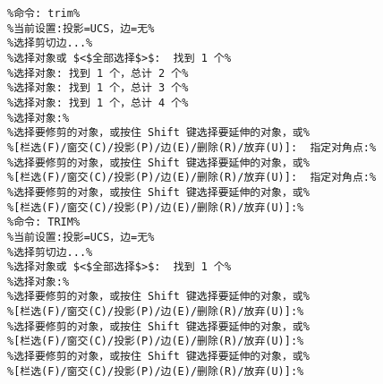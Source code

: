 \begin{lstlisting}
%命令: trim%
%当前设置:投影=UCS，边=无%
%选择剪切边...%
%选择对象或 $<$全部选择$>$:  找到 1 个%
%选择对象: 找到 1 个，总计 2 个%
%选择对象: 找到 1 个，总计 3 个%
%选择对象: 找到 1 个，总计 4 个%
%选择对象:%
%选择要修剪的对象，或按住 Shift 键选择要延伸的对象，或%
%[栏选(F)/窗交(C)/投影(P)/边(E)/删除(R)/放弃(U)]:  指定对角点:%
%选择要修剪的对象，或按住 Shift 键选择要延伸的对象，或%
%[栏选(F)/窗交(C)/投影(P)/边(E)/删除(R)/放弃(U)]:  指定对角点:%
%选择要修剪的对象，或按住 Shift 键选择要延伸的对象，或%
%[栏选(F)/窗交(C)/投影(P)/边(E)/删除(R)/放弃(U)]:%
%命令: TRIM%
%当前设置:投影=UCS，边=无%
%选择剪切边...%
%选择对象或 $<$全部选择$>$:  找到 1 个%
%选择对象:%
%选择要修剪的对象，或按住 Shift 键选择要延伸的对象，或%
%[栏选(F)/窗交(C)/投影(P)/边(E)/删除(R)/放弃(U)]:%
%选择要修剪的对象，或按住 Shift 键选择要延伸的对象，或%
%[栏选(F)/窗交(C)/投影(P)/边(E)/删除(R)/放弃(U)]:%
%选择要修剪的对象，或按住 Shift 键选择要延伸的对象，或%
%[栏选(F)/窗交(C)/投影(P)/边(E)/删除(R)/放弃(U)]:%
\end{lstlisting}
\endinput